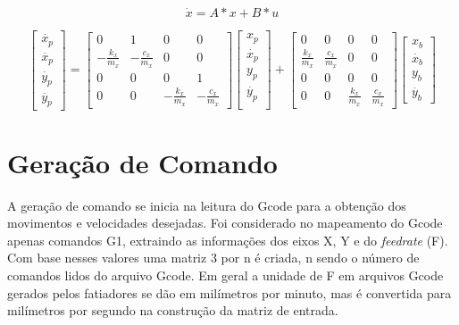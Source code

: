 \begin{equation}
    \label{eq:simp_state_space_din_model}
    \dot x = A*x+B*u
\end{equation}

\begin{equation}
    \label{eq:espaco_de_estados_din_model}
    \begin{bmatrix}
        \dot{x_p} \\
        \ddot{x_p} \\
        \dot{y_p} \\
        \ddot{y_p}
    \end{bmatrix}
    =
    \begin{bmatrix}
        0 & 1 & 0 & 0 \\
        -\frac{k_x}{m_x} & -\frac{c_x}{m_x} & 0 & 0 \\
        0 & 0 & 0 & 1 \\
        0 & 0 & -\frac{k_x}{m_x} & -\frac{c_x}{m_x}
    \end{bmatrix}
    \begin{bmatrix}
        x_p \\
        \dot{x_p} \\        
        y_p \\
        \dot{y_p} \\
    \end{bmatrix}
    +
    \begin{bmatrix}
        0 & 0 & 0 & 0 \\
        \frac{k_x}{m_x} & \frac{c_x}{m_x} & 0 & 0 \\
        0 & 0 & 0 & 0 \\
        0 & 0 & \frac{k_x}{m_x} & \frac{c_x}{m_x}
    \end{bmatrix}
    \begin{bmatrix}
        x_b \\
        \dot{x_b}  \\
        y_b \\
        \dot{y_b} 
    \end{bmatrix}
\end{equation}

\section{Geração de Comando}

A geração de comando se inicia na leitura do Gcode para a obtenção dos movimentos e velocidades desejadas.
Foi considerado no mapeamento do Gcode apenas comandos G1, extraindo
as informações dos eixos X, Y e do \textit{feedrate} (F). Com base nesses valores
uma matriz 3 por n é criada, n sendo o número de comandos lidos do arquivo Gcode.
Em geral a unidade de F em arquivos Gcode gerados pelos fatiadores se dão em milímetros por minuto,
mas é convertida para milímetros por segundo na construção da matriz de entrada.

